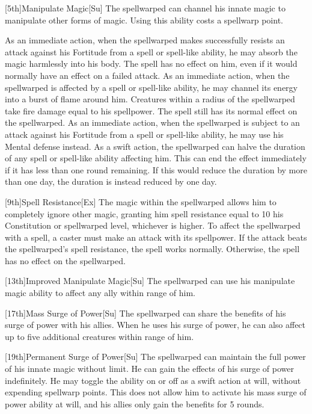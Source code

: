 [5th]{Manipulate Magic}[Su]
The spellwarped can channel his innate magic to manipulate other forms of magic.
Using this ability costs a spellwarp point.

As an immediate action, when the spellwarped makes successfully resists an attack against his Fortitude from a spell or spell-like ability, he may absorb the magic harmlessly into his body.
The spell has no effect on him, even if it would normally have an effect on a failed attack.
As an immediate action, when the spellwarped is affected by a spell or spell-like ability, he may channel its energy into a burst of flame around him.
Creatures within a \areasmall radius of the spellwarped take fire damage equal to his spellpower.
The spell still has its normal effect on the spellwarped.
As an immediate action, when the spellwarped is subject to an attack against his Fortitude from a spell or spell-like ability, he may use his Mental defense instead.
As a swift action, the spellwarped can halve the duration of any spell or spell-like ability affecting him.
This can end the effect immediately if it has less than one round remaining.
If this would reduce the duration by more than one day, the duration is instead reduced by one day.

[9th]{Spell Resistance}[Ex]
The magic within the spellwarped allows him to completely ignore other magic, granting him spell resistance equal to 10 \add his Constitution or spellwarped level, whichever is higher.
To affect the spellwarped with a spell, a caster must make an attack with its spellpower.
If the attack beats the spellwarped's spell resistance, the spell works normally.
Otherwise, the spell has no effect on the spellwarped.

[13th]{Improved Manipulate Magic}[Su]
The spellwarped can use his manipulate magic ability to affect any ally within \rngmed range of him.

[17th]{Mass Surge of Power}[Su]
The spellwarped can share the benefits of his surge of power with his allies.
When he uses his surge of power, he can also affect up to five additional creatures within \rngmed range of him.

[19th]{Permanent Surge of Power}[Su]
The spellwarped can maintain the full power of his innate magic without limit.
He can gain the effects of his surge of power indefinitely.
He may toggle the ability on or off as a swift action at will, without expending spellwarp points.
This does not allow him to activate his mass surge of power ability at will, and his allies only gain the benefits for 5 rounds.

